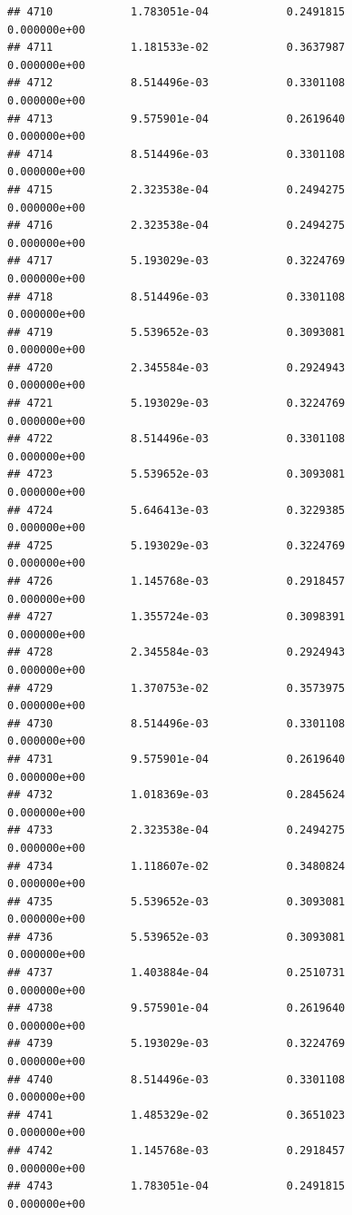 \documentclass[
]{article}
\begin{document}
\begin{verbatim}
## 4710            1.783051e-04            0.2491815            0.000000e+00
## 4711            1.181533e-02            0.3637987            0.000000e+00
## 4712            8.514496e-03            0.3301108            0.000000e+00
## 4713            9.575901e-04            0.2619640            0.000000e+00
## 4714            8.514496e-03            0.3301108            0.000000e+00
## 4715            2.323538e-04            0.2494275            0.000000e+00
## 4716            2.323538e-04            0.2494275            0.000000e+00
## 4717            5.193029e-03            0.3224769            0.000000e+00
## 4718            8.514496e-03            0.3301108            0.000000e+00
## 4719            5.539652e-03            0.3093081            0.000000e+00
## 4720            2.345584e-03            0.2924943            0.000000e+00
## 4721            5.193029e-03            0.3224769            0.000000e+00
## 4722            8.514496e-03            0.3301108            0.000000e+00
## 4723            5.539652e-03            0.3093081            0.000000e+00
## 4724            5.646413e-03            0.3229385            0.000000e+00
## 4725            5.193029e-03            0.3224769            0.000000e+00
## 4726            1.145768e-03            0.2918457            0.000000e+00
## 4727            1.355724e-03            0.3098391            0.000000e+00
## 4728            2.345584e-03            0.2924943            0.000000e+00
## 4729            1.370753e-02            0.3573975            0.000000e+00
## 4730            8.514496e-03            0.3301108            0.000000e+00
## 4731            9.575901e-04            0.2619640            0.000000e+00
## 4732            1.018369e-03            0.2845624            0.000000e+00
## 4733            2.323538e-04            0.2494275            0.000000e+00
## 4734            1.118607e-02            0.3480824            0.000000e+00
## 4735            5.539652e-03            0.3093081            0.000000e+00
## 4736            5.539652e-03            0.3093081            0.000000e+00
## 4737            1.403884e-04            0.2510731            0.000000e+00
## 4738            9.575901e-04            0.2619640            0.000000e+00
## 4739            5.193029e-03            0.3224769            0.000000e+00
## 4740            8.514496e-03            0.3301108            0.000000e+00
## 4741            1.485329e-02            0.3651023            0.000000e+00
## 4742            1.145768e-03            0.2918457            0.000000e+00
## 4743            1.783051e-04            0.2491815            0.000000e+00

\end{verbatim}
\end{document}
